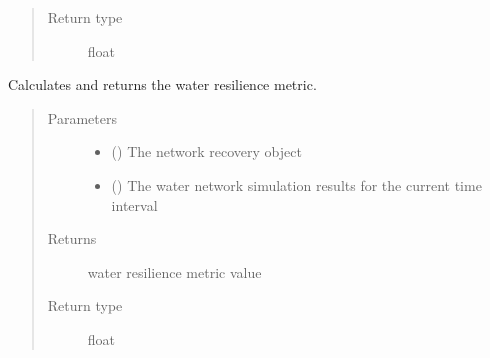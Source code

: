 \documentclass[letterpaper,10pt,english]{sphinxmanual}
\begin{document}
\begin{fulllineitems}
\begin{fulllineitems}
\begin{quote}
\begin{description}
\item[{Return type}] \leavevmode
\sphinxAtStartPar
float

\end{description}\end{quote}

\end{fulllineitems}


\begin{fulllineitems}
\label{\detokenize{apidoc:dreaminsg_integrated_model.src.resilience_metrics.WeightedResilienceMetric.calculate_water_resmetric}}
\sphinxAtStartPar
Calculates and returns the water resilience metric.
\begin{quote}\begin{description}
\item[{Parameters}] \leavevmode\begin{itemize}
\item {} 
\sphinxAtStartPar
{} () \textendash{} The network recovery object

\item {} 
\sphinxAtStartPar
{} () \textendash{} The water network simulation results for the current time interval

\end{itemize}

\item[{Returns}] \leavevmode
\sphinxAtStartPar
water resilience metric value

\item[{Return type}] \leavevmode
\sphinxAtStartPar
float

\end{description}\end{quote}

\end{fulllineitems}



\end{fulllineitems}
\end{document}
